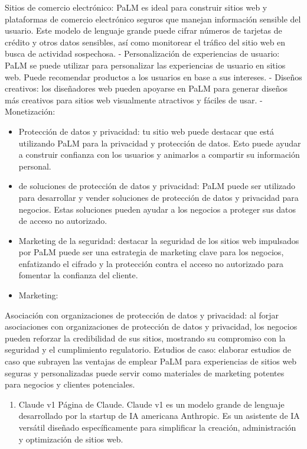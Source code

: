 \documentclass[a4paper12pt]{article}
\providecommand{\tightlist}{%
      \setlength{\itemsep}{0pt}\setlength{\parskip}{0pt}}
\begin{document}
Sitios de comercio electrónico: PaLM es ideal para construir sitios web
y plataformas de comercio electrónico seguros que manejan información
sensible del usuario. Este modelo de lenguaje grande puede cifrar
números de tarjetas de crédito y otros datos sensibles, así como
monitorear el tráfico del sitio web en busca de actividad sospechosa. -
Personalización de experiencias de usuario: PaLM se puede utilizar para
personalizar las experiencias de usuario en sitios web. Puede recomendar
productos a los usuarios en base a sus intereses. - Diseños creativos:
los diseñadores web pueden apoyarse en PaLM para generar diseños más
creativos para sitios web visualmente atractivos y fáciles de usar. -
Monetización:

\begin{itemize}
\tightlist
\item
  Protección de datos y privacidad: tu sitio web puede destacar que está
  utilizando PaLM para la privacidad y protección de datos. Esto puede
  ayudar a construir confianza con los usuarios y animarlos a compartir
  su información personal.
\item
  de soluciones de protección de datos y privacidad: PaLM puede ser
  utilizado para desarrollar y vender soluciones de protección de datos
  y privacidad para negocios. Estas soluciones pueden ayudar a los
  negocios a proteger sus datos de acceso no autorizado.
\item
  Marketing de la seguridad: destacar la seguridad de los sitios web
  impulsados por PaLM puede ser una estrategia de marketing clave para
  los negocios, enfatizando el cifrado y la protección contra el acceso
  no autorizado para fomentar la confianza del cliente.
\item
  Marketing:
\end{itemize}

Asociación con organizaciones de protección de datos y privacidad: al
forjar asociaciones con organizaciones de protección de datos y
privacidad, los negocios pueden reforzar la credibilidad de sus sitios,
mostrando su compromiso con la seguridad y el cumplimiento regulatorio.
Estudios de caso: elaborar estudios de caso que subrayen las ventajas de
emplear PaLM para experiencias de sitios web seguras y personalizadas
puede servir como materiales de marketing potentes para negocios y
clientes potenciales.

\begin{enumerate}
\def\labelenumi{\arabic{enumi}.}
\setcounter{enumi}{7}
\tightlist
\item
  Claude v1 Página de Claude. Claude v1 es un modelo grande de lenguaje
  desarrollado por la startup de IA americana Anthropic. Es un asistente
  de IA versátil diseñado específicamente para simplificar la creación,
  administración y optimización de sitios web.
\end{enumerate}
\end{document}
